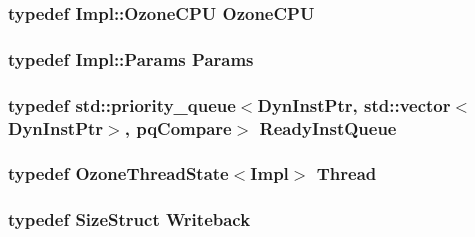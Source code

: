 \label{classLWBackEnd_a3beb474846c53de6d7b8047314dcf3cd}
\hypertarget{classLWBackEnd_a9730cc41bccb218cae8f32869b8d887e}{
\subsubsection[{OzoneCPU}]{\setlength{\rightskip}{0pt plus 5cm}typedef Impl::OzoneCPU {\bf OzoneCPU}}}
\label{classLWBackEnd_a9730cc41bccb218cae8f32869b8d887e}
\hypertarget{classLWBackEnd_a818e103eae798a24a06a0a34631849ea}{
\subsubsection[{Params}]{\setlength{\rightskip}{0pt plus 5cm}typedef Impl::Params {\bf Params}}}
\label{classLWBackEnd_a818e103eae798a24a06a0a34631849ea}
\hypertarget{classLWBackEnd_a60636ae8f3b649078c4f1bdd3b20dcad}{
\subsubsection[{ReadyInstQueue}]{\setlength{\rightskip}{0pt plus 5cm}typedef std::priority\_\-queue$<${\bf DynInstPtr}, {\bf std::vector}$<${\bf DynInstPtr}$>$, {\bf pqCompare}$>$ {\bf ReadyInstQueue}}}
\label{classLWBackEnd_a60636ae8f3b649078c4f1bdd3b20dcad}
\hypertarget{classLWBackEnd_a9311aca87e8229ec3f7a7422ccbc9fbe}{
\subsubsection[{Thread}]{\setlength{\rightskip}{0pt plus 5cm}typedef {\bf OzoneThreadState}$<$Impl$>$ {\bf Thread}}}
\label{classLWBackEnd_a9311aca87e8229ec3f7a7422ccbc9fbe}
\hypertarget{classLWBackEnd_a20d1fb15b536d49c687dee42d95c1a87}{
\subsubsection[{Writeback}]{\setlength{\rightskip}{0pt plus 5cm}typedef {\bf SizeStruct} {\bf Writeback}}}
\label{classLWBackEnd_a20d1fb15b536d49c687dee42d95c1a87}


